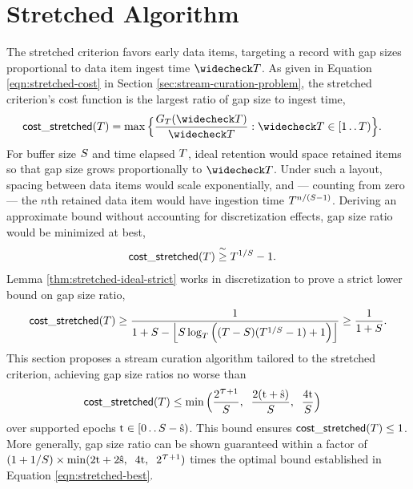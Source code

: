 \section{Stretched Algorithm} \label{sec:stretched}

The stretched criterion favors early data items, targeting a record with gap sizes proportional to data item ingest time $\colorTbar$.
As given in Equation \ref{eqn:stretched-cost} in Section \ref{sec:stream-curation-problem}, the stretched criterion's cost function is the largest ratio of gap size to ingest time,
\begin{align*}
\mathsf{cost\_stretched}(\colorT)
&=
\max\Big\{\frac{\colorG_{\colorT}(\colorTbar)}{\colorTbar} : \colorTbar \in [1 \twodots \colorT)\Big\}.
\end{align*}
For buffer size $\colorS$ and time elapsed $\colorT$, ideal retention would space retained items so that gap size grows proportionally to $\colorTbar$.
Under such a layout, spacing between data items would scale exponentially, and --- counting from zero --- the $n$th retained data item would have ingestion time $\colorT^{n/(\colorS - 1)}$.
Deriving an approximate bound without accounting for discretization effects, gap size ratio would be minimized at best,
\begin{align}
\label{eqn:approx-gap-bound}
\mathsf{cost\_stretched}(\colorT)
&\stackrel{\sim}{\geq}
\colorT^{1/\colorS} - 1.
\end{align}
Lemma \ref{thm:stretched-ideal-strict} works in discretization to prove a strict lower bound on gap size ratio,
\begin{align}
\mathsf{cost\_stretched}(\colorT)
\geq
\frac{
  1
}{
  1 + \colorS
  - \left\lfloor \colorS \log_{\colorT}\Big(
    (\colorT - \colorS)(\colorT^{1/\colorS} - 1) + 1
  \Big)\right\rfloor
}
\geq
\frac{
  1
}{
  1 + \colorS
}.
\label{eqn:stretched-best}
\end{align}
This section proposes a stream curation algorithm tailored to the stretched criterion, achieving gap size ratios no worse than
\begin{align}
\mathsf{cost\_stretched}(\colorT)
&\leq
\min\Big(
  \frac{2^{\colortau + 1}}{\colorS},\;\;
  \frac{2(\colort + \colors)}{\colorS},\;\;
  \frac{4\colort}{\colorS}
\Big)
\label{eqn:stretchednoworse}
\end{align}
over supported epochs $\colort \in [0\twodots\colorS - \colors)$.
This bound ensures $\mathsf{cost\_stretched}(\colorT) \leq 1$.
More generally, gap size ratio can be shown guaranteed within a factor of $(1 + 1/\colorS)\times\min(2\colort + 2\colors, \;\; 4\colort, \;\; 2^{\colortau + 1})$ times the optimal bound established in Equation \ref{eqn:stretched-best}.

